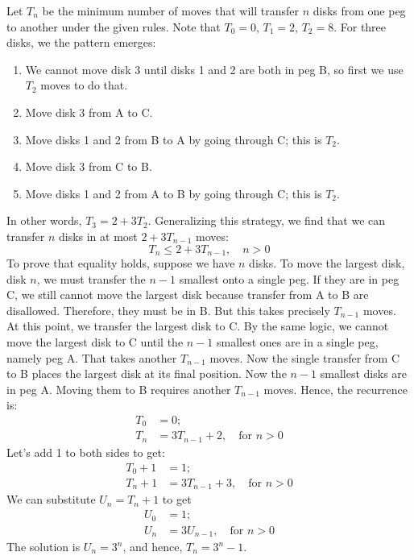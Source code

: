 \documentclass[12pt]{article}
\newenvironment{sol}[1][Solution]{\begin{trivlist}
		\item[\hskip \labelsep {\bfseries #1:}]}{\end{trivlist}}
\begin{document}
\begin{sol}
	Let $T_n$ be the minimum number of moves that will transfer $n$ disks
	from one peg to another under the given rules. Note that $T_0=0$, $T_1=2$,
	$T_2=8$. For three disks, we the pattern emerges:
	\begin{enumerate}
		\item  We cannot move disk 3 until disks 1 and 2 are both in peg B, so
		first we use $T_2$ moves to do that.
		\item Move disk 3 from A to C.
		\item Move disks 1 and 2 from B to A by going through C; this is $T_2$.
		\item Move disk 3 from C to B.
		\item Move disks 1 and 2 from A to B by going through C; this is $T_2$.
	\end{enumerate}
	In other words, $T_3=2+3T_2$. Generalizing this strategy, we find that
	we can transfer $n$ disks in at most $2+3T_{n-1}$ moves:
	\[
	T_n\leq 2+3T_{n-1},\quad n>0
	\]
	To prove that equality holds, suppose we have $n$ disks. To move the largest disk, disk $n$, we must transfer the $n-1$ smallest onto a single peg. If they are in peg C, we still cannot move the largest disk because transfer from A to B are disallowed. Therefore,
	they must be in B. But this takes precisely $T_{n-1}$ moves. At this point, we transfer
	the largest disk to C. By the same logic, we cannot move the largest disk to C
	until the $n-1$ smallest ones are in a single peg, namely peg A. That takes another
	$T_{n-1}$ moves. Now the single transfer from C to B places the largest disk at its final
	position. Now the $n-1$ smallest disks are in peg A. Moving them to B requires
	another $T_{n-1}$ moves. Hence, the recurrence is:
	\begin{align*}
		T_0&=0;\\
		T_{n}&=3T_{n-1}+2,\quad \text{for } n>0
	\end{align*}
	Let's add 1 to both sides to get:
	\begin{align*}
		T_0+1&=1;\\
		T_n+1&=3T_{n-1}+3,\quad \text{for } n>0
	\end{align*}
	We can substitute $U_{n}=T_{n}+1$ to get
	\begin{align*}
		U_{0}&=1;\\
		U_{n}&=3U_{n-1},\quad \text{for } n>0
	\end{align*}
	The solution is $U_{n}=3^n$, and hence, $T_n=3^{n}-1$.
\end{sol}
\end{document}
